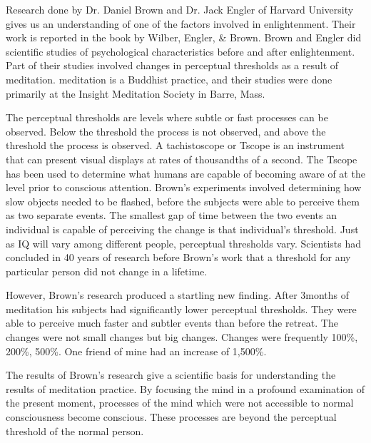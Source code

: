 \documentclass[a5paper,10pt,english]{book}
\begin{document}
\sphinxAtStartPar
Research done by Dr. Daniel Brown and Dr. Jack Engler of Harvard
University gives us an understanding of one of the factors involved in
enlightenment. Their work is reported in the book  by Wilber, Engler, \& Brown. Brown and Engler did
scientific studies of psychological characteristics before and after
enlightenment. Part of their studies involved changes in perceptual
thresholds as a result of  meditation. 
meditation is a Buddhist practice, and their studies were done
primarily at the Insight Meditation Society in Barre, Mass.

\sphinxAtStartPar
The perceptual thresholds are levels where subtle or fast processes can
be observed. Below the threshold the process is not observed, and above
the threshold the process is observed. A tachistoscope or T\sphinxhyphen{}scope is an
instrument that can present visual displays at rates of thousandths of a
second. The T\sphinxhyphen{}scope has been used to determine what humans are capable
of becoming aware of at the level prior to conscious attention. Brown’s
experiments involved determining how slow objects needed to be flashed,
before the subjects were able to perceive them as two separate events.
The smallest gap of time between the two events an individual is capable
of perceiving the change is that individual’s threshold. Just as IQ will
vary among different people, perceptual thresholds vary. Scientists had
concluded in 40 years of research before Brown’s work that a threshold
for any particular person did not change in a lifetime.

\sphinxAtStartPar
However, Brown’s research produced a startling new finding. After
3\sphinxhyphen{}months of  meditation his subjects had significantly
lower perceptual thresholds. They were able to perceive much faster and
subtler events than before the retreat. The changes were not small
changes but big changes. Changes were frequently 100\%, 200\%, 500\%. One
friend of mine had an increase of 1,500\%.

\sphinxAtStartPar
The results of Brown’s research give a scientific basis for
understanding the results of meditation practice. By focusing the mind
in a profound examination of the present moment, processes of the mind
which were not accessible to normal consciousness become conscious.
These processes are beyond the perceptual threshold of the normal
person.
\end{document}
